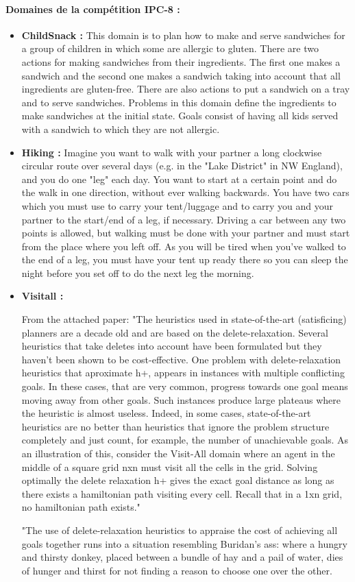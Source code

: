 \paragraph*{Domaines de la compétition IPC-8 :}
\begin{itemize}
\item \textbf{ChildSnack :}
{\color{red}This domain is to plan how to make and serve sandwiches for a group of children in which some are allergic to gluten. There are two actions for making sandwiches from their ingredients. The first one makes a sandwich and the second one makes a sandwich taking into account that all ingredients are gluten-free. There are also actions to put a sandwich on a tray and to serve sandwiches.
Problems in this domain define the ingredients to make sandwiches at the initial state. Goals consist of having all kids served with a sandwich to which they are not allergic.}
\item \textbf{Hiking :}
{\color{red}Imagine you want to walk with your partner a long clockwise circular route over several days (e.g. in the "Lake District" in NW England), and you do one "leg" each day. You want to start at a certain point and do the walk in one direction, without ever walking backwards. You have two cars which you must use to carry your tent/luggage and to carry you and your partner to the start/end of a leg, if necessary. Driving a car between any two points is allowed, but walking must be done with your partner and must start from the place where you left off. As you will be tired when you've walked to the end of a leg, you must have your tent up ready there so you can sleep the night before you set off to do the next leg the morning.}
\item \textbf{Visitall :}
{\color{red}From the attached paper: "The heuristics used in state-of-the-art (satisficing) planners are a decade old and are based on the delete-relaxation. Several heuristics that take deletes into account have been formulated but they haven’t been shown to be cost-effective. One problem with delete-relaxation heuristics that aproximate h+, appears in instances with multiple conflicting goals. In these cases, that are very common, progress towards one goal means moving away from other goals. Such instances produce large plateaus where the heuristic is almost useless. Indeed, in some cases, state-of-the-art heuristics are no better than heuristics that ignore the problem structure completely and just count, for example, the number of unachievable goals. As an illustration of this, consider the Visit-All domain where an agent in the middle of a square grid nxn must visit all the cells in the grid. Solving optimally the delete relaxation h+ gives the exact goal distance as long as there exists a hamiltonian path visiting every cell. Recall that in a 1xn grid, no hamiltonian path exists."

"The use of delete-relaxation heuristics to appraise the cost of achieving all goals together runs into a situation resembling Buridan’s ass: where a hungry and thirsty donkey, placed between a bundle of hay and a pail of water, dies of hunger and thirst for not finding a reason to choose one over the other.}
\end{itemize}

